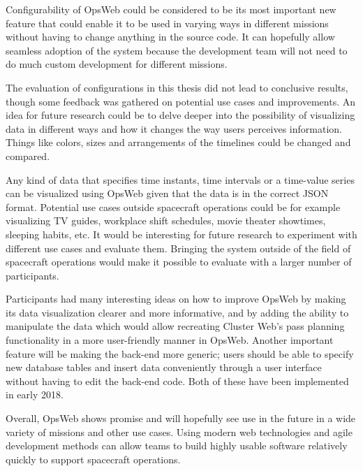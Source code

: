 Configurability of OpsWeb could be considered to be its most important new feature that could enable it to be used in varying ways in different missions without having to change anything in the source code. It can hopefully allow seamless adoption of the system because the development team will not need to do much custom development for different missions. 

The evaluation of configurations in this thesis did not lead to conclusive results, though some feedback was gathered on potential use cases and improvements. An idea for future research could be to delve deeper into the possibility of visualizing data in different ways and how it changes the way users perceives information. Things like colors, sizes and arrangements of the timelines could be changed and compared.

Any kind of data that specifies time instants, time intervals or a time-value series can be visualized using OpsWeb given that the data is in the correct JSON format. Potential use cases outside spacecraft operations could be for example visualizing TV guides, workplace shift schedules, movie theater showtimes, sleeping habits, etc. It would be interesting for future research to experiment with different use cases and evaluate them. Bringing the system outside of the field of spacecraft operations would make it possible to evaluate with a larger number of participants.

Participants had many interesting ideas on how to improve OpsWeb by making its data visualization clearer and more informative, and by adding the ability to manipulate the data which would allow recreating Cluster Web's pass planning functionality in a more user-friendly manner in OpsWeb. Another important feature will be making the back-end more generic; users should be able to specify new database tables and insert data conveniently through a user interface without having to edit the back-end code. Both of these have been implemented in early 2018.

Overall, OpsWeb shows promise and will hopefully see use in the future in a wide variety of missions and other use cases. Using modern web technologies and agile development methods can allow teams to build highly usable software relatively quickly to support spacecraft operations.